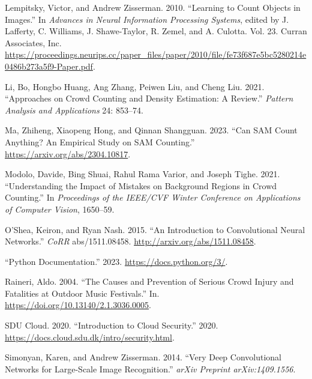 \documentclass[
]{article}
\newlength{\cslhangindent}
\newlength{\cslentryspacingunit} %
\newenvironment{CSLReferences}[2] %
 {%
  \setlength{\parindent}{0pt}
  \ifodd #1
  \let\oldpar\par
  \def\par{\hangindent=\cslhangindent\oldpar}
  \fi
  \setlength{\parskip}{#2\cslentryspacingunit}
 }%
 {}
\begin{document}
\begin{CSLReferences}{1}{0}
\leavevmode{}%
Lempitsky, Victor, and Andrew Zisserman. 2010. {``Learning to Count
Objects in Images.''} In \emph{Advances in Neural Information Processing
Systems}, edited by J. Lafferty, C. Williams, J. Shawe-Taylor, R. Zemel,
and A. Culotta. Vol. 23. Curran Associates, Inc.
\url{https://proceedings.neurips.cc/paper_files/paper/2010/file/fe73f687e5bc5280214e0486b273a5f9-Paper.pdf}.

\leavevmode{}%
Li, Bo, Hongbo Huang, Ang Zhang, Peiwen Liu, and Cheng Liu. 2021.
{``Approaches on Crowd Counting and Density Estimation: A Review.''}
\emph{Pattern Analysis and Applications} 24: 853--74.

\leavevmode{}%
Ma, Zhiheng, Xiaopeng Hong, and Qinnan Shangguan. 2023. {``Can SAM Count
Anything? An Empirical Study on SAM Counting.''}
\url{https://arxiv.org/abs/2304.10817}.

\leavevmode{}%
Modolo, Davide, Bing Shuai, Rahul Rama Varior, and Joseph Tighe. 2021.
{``Understanding the Impact of Mistakes on Background Regions in Crowd
Counting.''} In \emph{Proceedings of the IEEE/CVF Winter Conference on
Applications of Computer Vision}, 1650--59.

\leavevmode{}%
O'Shea, Keiron, and Ryan Nash. 2015. {``An Introduction to Convolutional
Neural Networks.''} \emph{CoRR} abs/1511.08458.
\url{http://arxiv.org/abs/1511.08458}.

\leavevmode{}%
{``Python Documentation.''} 2023. \url{https://docs.python.org/3/}.

\leavevmode{}%
Raineri, Aldo. 2004. {``The Causes and Prevention of Serious Crowd
Injury and Fatalities at Outdoor Music Festivals.''} In.
\url{https://doi.org/10.13140/2.1.3036.0005}.

\leavevmode{}%
SDU Cloud. 2020. {``{Introduction to Cloud Security}.''} 2020.
\url{https://docs.cloud.sdu.dk/intro/security.html}.

\leavevmode{}%
Simonyan, Karen, and Andrew Zisserman. 2014. {``Very Deep Convolutional
Networks for Large-Scale Image Recognition.''} \emph{arXiv Preprint
arXiv:1409.1556}.


\end{CSLReferences}
\end{document}
